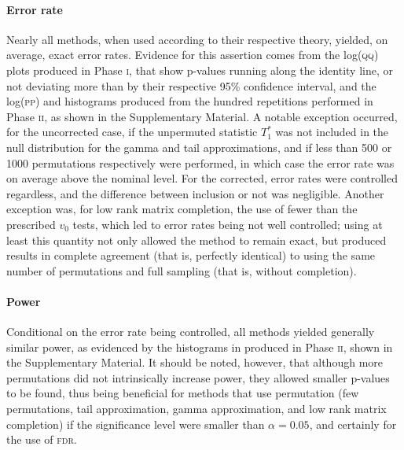 \paragraph{Error rate} Nearly all methods, when used according to their respective theory, yielded, on average, exact error rates. Evidence for this assertion comes from the log(\textsc{qq}) plots produced in Phase \textsc{i}, that show p-values running along the identity line, or not deviating more than by their respective 95\% confidence interval, and the log(\textsc{pp}) and histograms produced from the hundred repetitions performed in Phase \textsc{ii}, as shown in the Supplementary Material. A notable exception occurred, for the uncorrected case, if the unpermuted statistic $T^*_1$ was not included in the null distribution for the gamma and tail approximations, and if less than 500 or 1000 permutations respectively were performed, in which case the error rate was on average above the nominal level. For the corrected, error rates were controlled regardless, and the difference between inclusion or not was negligible. Another exception was, for low rank matrix completion, the use of fewer than the prescribed $v_0$ tests, which led to error rates being not well controlled; using at least this quantity not only allowed the method to remain exact, but produced results in complete agreement (that is, perfectly identical) to using the same number of permutations and full sampling (that is, without completion).

\paragraph{Power} Conditional on the error rate being controlled, all methods yielded generally similar power, as evidenced by the histograms in produced in Phase \textsc{ii}, shown in the Supplementary Material. It should be noted, however, that although more permutations did not intrinsically increase power, they allowed smaller p-values to be found, thus being beneficial for methods that use permutation (few permutations, tail approximation, gamma approximation, and low rank matrix completion) if the significance level were smaller than $\alpha = 0.05$, and certainly for the use of \textsc{fdr}.

